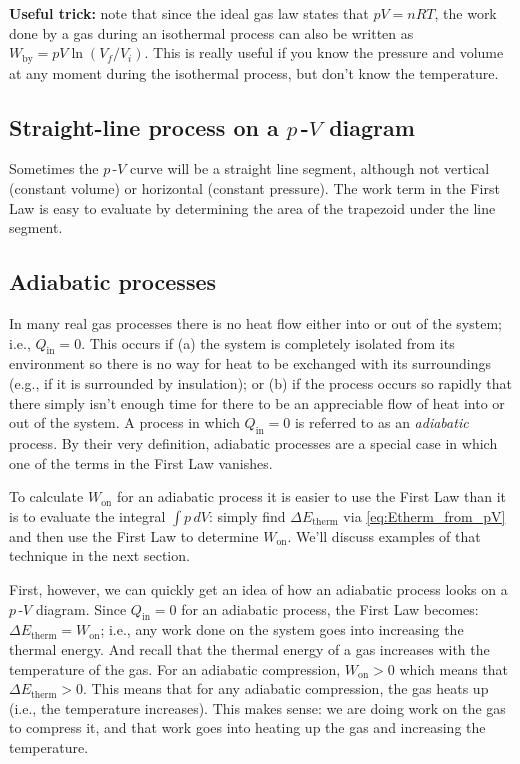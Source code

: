 \textbf{Useful trick:} note that since the ideal gas law states that 
$pV = nRT$, the work done by a gas during an isothermal process can 
also be written as $W_\text{by} = pV\ln (V_f/V_i)$. This is really 
useful if you know the pressure and volume at any moment during 
the isothermal process, but don't know the temperature.

\subsection*{Straight-line process on a $p$\,-$V$ diagram} 
Sometimes the $p$\,-$V$ curve will be a straight line segment, although not 
vertical (constant volume) or horizontal (constant pressure).
The work term in  the First Law is easy to evaluate by determining
the area of the trapezoid under the line segment.

\subsection*{Adiabatic processes}
In many real gas processes there is no heat flow either into or out
of the system; i.e., $Q_\text{in} = 0$. This occurs if (a) the system
is completely isolated from its environment so there is no way for
heat to be exchanged with its surroundings (e.g., if it is surrounded
by insulation); or (b) if the process occurs so rapidly that there
simply isn't enough time for there to be an appreciable flow of heat
into or out of the system. A process in which  $Q_\text{in} = 0$ is 
referred to as an \emph{adiabatic} process.  By their very definition, 
adiabatic processes are a special case in which one of the terms in
the First Law vanishes.

To calculate $W_\text{on}$ for an adiabatic process it is easier to use
the First Law than it is to evaluate the integral 
$\int p\, dV$:
simply find $\Delta E_\text{therm}$ via \eqref{eq:Etherm_from_pV}
and then use the First Law to determine $W_\text{on}$.
We'll discuss examples of that technique in the next section.

First, however, we can quickly get an idea of how an adiabatic process
looks on a $p$\,-$V$ diagram. Since $Q_\text{in} = 0$ for an adiabatic
process, the First Law becomes:  $\Delta E_\text{therm} = W_\text{on}$;
i.e., any work done on the system goes into increasing the thermal
energy.  And recall that the thermal energy of a gas increases with the
temperature of the gas.  For an adiabatic compression, $W_\text{on} > 0$
which means that $\Delta E_\text{therm} > 0$.  This means that for any
adiabatic compression, the gas heats up (i.e., the temperature increases).
This makes sense:  we are doing work on the gas to compress it, and that
work goes into heating up the gas and increasing the temperature.

